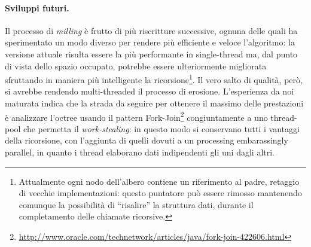 \paragraph{Sviluppi futuri.}
Il processo di \emph{milling} è frutto di più riscritture successive, ognuna delle quali ha sperimentato un modo diverso per rendere più efficiente e veloce l'algoritmo: la versione attuale risulta essere la più performante in single-thread ma, dal punto di vista dello spazio occupato, potrebbe essere ulteriormente migliorata sfruttando in maniera più intelligente la ricorsione\footnote{Attualmente ogni nodo dell'albero contiene un riferimento al padre, retaggio di vecchie implementazioni: questo puntatore può essere rimosso mantenendo comunque la possibilità di ``risalire'' la struttura dati, durante il completamento delle chiamate ricorsive.}. Il vero salto di qualità, però, si avrebbe rendendo multi-threaded il processo di erosione. L'esperienza da noi maturata indica che la strada da seguire per ottenere il massimo delle prestazioni è analizzare l'octree usando il pattern Fork-Join\footnote{\url{http://www.oracle.com/technetwork/articles/java/fork-join-422606.html}} congiuntamente a uno thread-pool che permetta il \emph{work-stealing}: in questo modo si conservano tutti i vantaggi della ricorsione, con l'aggiunta di quelli dovuti a un processing embarassingly parallel, in quanto i thread elaborano dati indipendenti gli uni dagli altri.
